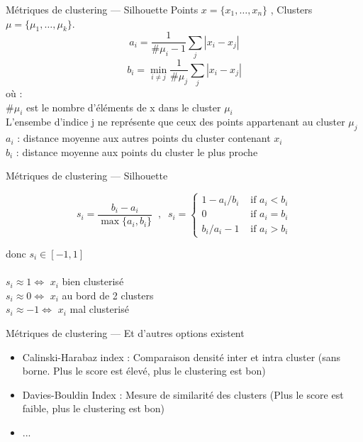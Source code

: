 \begin{frame}{Métriques de clustering --- Silhouette}
  Points $x = \{x_1, \dotsc, x_n\}$ , Clusters $\mu = \{\mu_1, \dotsc, \mu_k\}$. \\
  \[
  \boxed{a_i = \frac{1}{\#\mu_i-1}\sum_j |x_i - x_j|}
  \]
  \[
  \boxed{b_i = \min_{i \neq j} \frac{1}{\#\mu_j}\sum_j |x_i - x_j|}
  \]
  où : \\
  $\#\mu_i$ est le nombre d'éléments de x dans le cluster $\mu_i$ \\
  L'ensembe d'indice j ne représente que ceux des points appartenant au cluster $\mu_j$ \\
  $a_i$ : distance moyenne aux autres points du cluster contenant $x_i$ \\
  $b_i$ : distance moyenne aux points du cluster le plus proche
  
\end{frame}

\begin{frame}{Métriques de clustering --- Silhouette}
  
  \begin{center}
    \[
    s_i = \frac{b_i - a_i}{\max\{a_i, b_i\}}\;\;,\;\;
    s_i = \left\{
    \begin{array}{ll}
      1 - a_i/b_i & \mbox{ if } a_i < b_i \\[2mm]
      0 & \mbox{ if } a_i = b_i \\[2mm]
      b_i / a_i - 1 & \mbox{ if } a_i > b_i
    \end{array}\right.
    \]
    
  \end{center}
  donc $s_i \in [-1, 1]$ \\
  \\
  $s_i \approx 1 \iff$ $x_i$ bien clusterisé \\
  $s_i \approx 0 \iff$ $x_i$ au bord de 2 clusters\\
  $s_i \approx -1 \iff$ $x_i$ mal clusterisé
\end{frame}

\begin{frame}{Métriques de clustering --- Et d'autres options existent}
  \begin{itemize}
  \item Calinski-Harabaz index : Comparaison densité inter et intra cluster (sans borne. Plus le score est élevé, plus le clustering est bon)
  \item Davies-Bouldin Index : Mesure de similarité des clusters (Plus le score est faible, plus le clustering est bon)
  \item ...
  \end{itemize}
\end{frame}

